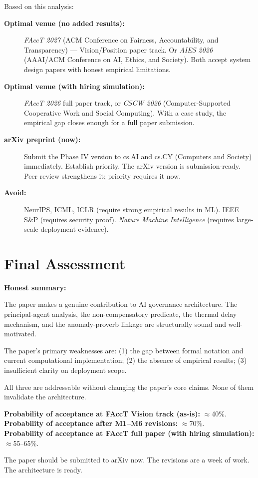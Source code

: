 \documentclass[12pt,a4paper]{article}
\theoremstyle{definition}
\begin{document}
Based on this analysis:

\begin{description}
\item[\textbf{Optimal venue (no added results):}] \emph{FAccT 2027} (ACM Conference
  on Fairness, Accountability, and Transparency) — Vision/Position paper track.
  Or \emph{AIES 2026} (AAAI/ACM Conference on AI, Ethics, and Society). Both
  accept system design papers with honest empirical limitations.

\item[\textbf{Optimal venue (with hiring simulation):}] \emph{FAccT 2026}
  full paper track, or \emph{CSCW 2026} (Computer-Supported Cooperative Work
  and Social Computing). With a case study, the empirical gap closes enough
  for a full paper submission.

\item[\textbf{arXiv preprint (now):}] Submit the Phase IV version to
  cs.AI and cs.CY (Computers and Society) immediately. Establish priority.
  The arXiv version is submission-ready. Peer review strengthens it;
  priority requires it now.

\item[\textbf{Avoid:}] NeurIPS, ICML, ICLR (require strong empirical
  results in ML). IEEE S\&P (requires security proof). \emph{Nature Machine
  Intelligence} (requires large-scale deployment evidence).
\end{description}

\section{Final Assessment}

\begin{mdframed}[style=defenseframe]
\textbf{Honest summary:}

The paper makes a genuine contribution to AI governance architecture. The
principal-agent analysis, the non-compensatory predicate, the thermal delay
mechanism, and the anomaly-proverb linkage are structurally sound and well-motivated.

The paper's primary weaknesses are: (1) the gap between formal notation and
current computational implementation; (2) the absence of empirical results;
(3) insufficient clarity on deployment scope.

All three are addressable without changing the paper's core claims.
None of them invalidate the architecture.

\textbf{Probability of acceptance at FAccT Vision track (as-is):} $\approx$40\%.\\
\textbf{Probability of acceptance after M1--M6 revisions:} $\approx$70\%.\\
\textbf{Probability of acceptance at FAccT full paper (with hiring simulation):}
$\approx$55--65\%.

The paper should be submitted to arXiv now. The revisions are a week of work.
The architecture is ready.
\end{mdframed}
\end{document}
